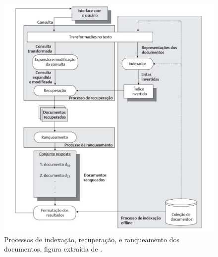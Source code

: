 \begin{figure}[H]
    \centering
    \includegraphics[width=1.0\textwidth]{img/baeza2013-figura-1-3.png}
    \caption{Processos de indexação, recuperação, e ranqueamento dos documentos, figura extraída de .}
    \label{fig:diagrama-baeza2013-fig1-3}
\end{figure}